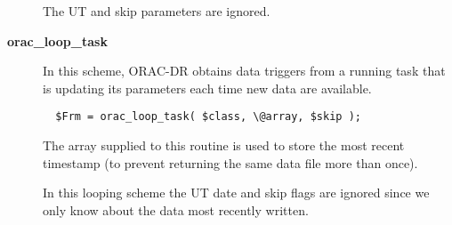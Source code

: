 \begin{description}
The UT and skip parameters are ignored.


\item[\textbf{orac\_loop\_task}] \mbox{}

In this scheme, ORAC-DR obtains data triggers from a running task
that is updating its parameters each time new data are available.

\begin{verbatim}
  $Frm = orac_loop_task( $class, \@array, $skip );
\end{verbatim}


The array supplied to this routine is used to store the most recent
timestamp (to prevent returning the same data file more than once).



In this looping scheme the UT date and skip flags are ignored since we
only know about the data most recently written.

\end{description}
